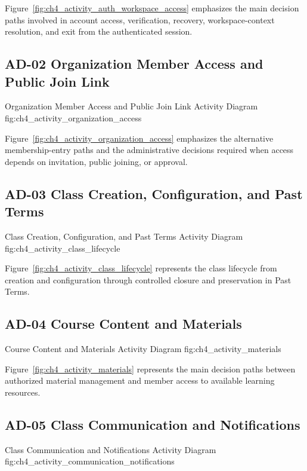 Figure~\ref{fig:ch4_activity_auth_workspace_access} emphasizes the main
decision paths involved in account access, verification, recovery,
workspace-context resolution, and exit from the authenticated session.

\subsection*{AD-02 Organization Member Access and Public Join Link}

\EduActivityFigureReadable{\EduActivityOrganizationAccessDiagram}
  {Organization Member Access and Public Join Link Activity Diagram}
  {fig:ch4_activity_organization_access}

Figure~\ref{fig:ch4_activity_organization_access} emphasizes the alternative
membership-entry paths and the administrative decisions required when access
depends on invitation, public joining, or approval.

\subsection*{AD-03 Class Creation, Configuration, and Past Terms}

\EduActivityFigure{\EduActivityClassLifecycleDiagram}
  {Class Creation, Configuration, and Past Terms Activity Diagram}
  {fig:ch4_activity_class_lifecycle}

Figure~\ref{fig:ch4_activity_class_lifecycle} represents the class lifecycle
from creation and configuration through controlled closure and preservation in
Past Terms.

\subsection*{AD-04 Course Content and Materials}

\EduActivityFigureReadable{\EduActivityMaterialsWorkflowDiagram}
  {Course Content and Materials Activity Diagram}
  {fig:ch4_activity_materials}

Figure~\ref{fig:ch4_activity_materials} represents the main decision paths
between authorized material management and member access to available learning
resources.

\subsection*{AD-05 Class Communication and Notifications}

\EduActivityFigureTall{\EduActivityCommunicationNotificationsDiagram}
  {Class Communication and Notifications Activity Diagram}
  {fig:ch4_activity_communication_notifications}

